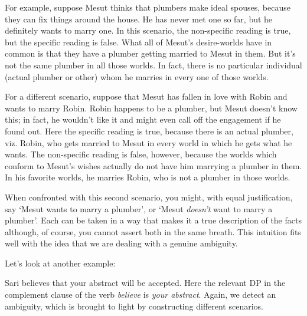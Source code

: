 For example, suppose Mesut thinks that plumbers make ideal spouses, because they
can fix things around the house. He has never met one so far, but he definitely
wants to marry one. In this scenario, the non-specific reading is true, but the
specific reading is false. What all of Mesut's desire-worlds have in common is
that they have a plumber getting married to Mesut in them. But it's not the same
plumber in all those worlds. In fact, there is no particular individual (actual
plumber or other) whom he marries in every one of those worlds.

For a different scenario, suppose that Mesut has fallen in love with Robin and
wants to marry Robin. Robin happens to be a plumber, but Mesut doesn't know
this; in fact, he wouldn't like it and might even call off the engagement if he
found out. Here the specific reading is true, because there is an actual
plumber, viz. Robin, who gets married to Mesut in every world in which he gets
what he wants. The non-specific reading is false, however, because the worlds
which conform to Mesut's wishes actually do not have him marrying a plumber in
them. In his favorite worlds, he marries Robin, who is not a plumber in those
worlds.

When confronted with this second scenario, you might, with equal justification,
say `Mesut wants to marry a plumber', or `Mesut \emph{doesn't} want to marry a
plumber'. Each can be taken in a way that makes it a true description of the
facts \dash although, of course, you cannot assert both in the same
breath. This intuition
fits well with the idea that we are dealing with a genuine ambiguity.

Let's look at another example:

\ex Sari believes that your abstract will be accepted. \xe
%
Here the relevant DP in the complement clause of the verb \emph{believe} is
\emph{your abstract}. Again, we detect an ambiguity, which is brought to light
by constructing different scenarios.

